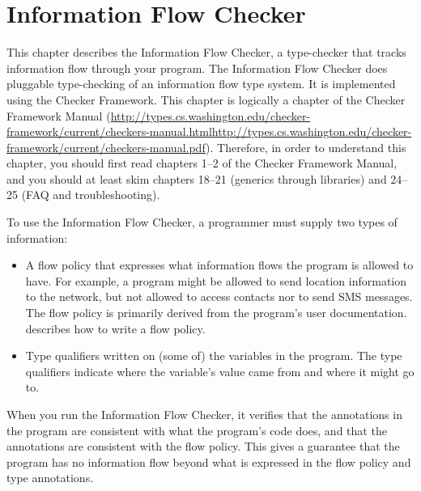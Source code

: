 \htmlhr

\newcommand{\theFlowChecker}{the Information Flow Checker\xspace}
\newcommand{\TheFlowChecker}{The Information Flow Checker\xspace}

\chapter{Information Flow Checker\label{flow-checker}}
This chapter describes the Information Flow Checker, a type-checker that 
tracks information flow through your program.
The Information Flow Checker does pluggable type-checking of an information flow type
system.  It is implemented using the Checker Framework.  This chapter is
logically a chapter of the 
Checker Framework Manual (\ifhevea\url{http://types.cs.washington.edu/checker-framework/current/checkers-manual.html}\else\url{http://types.cs.washington.edu/checker-framework/current/checkers-manual.pdf}\fi).
Therefore, in order to understand this chapter, you should first read
chapters 1--2 of the Checker Framework Manual, and you should at least skim
chapters 18--21 (generics through libraries) and 24--25 (FAQ and
troubleshooting). 



To use the Information Flow Checker, a programmer must supply two types of
information:

\begin{itemize}
\item
A flow policy that expresses what information flows the program is allowed
to have.   For example, a program might be allowed to send location
information to the network, but not allowed to access contacts nor to send
SMS messages.  The flow policy is primarily derived from the program's user
documentation.   describes how to write a flow
policy.
\item
{}
Type qualifiers written on (some of) the variables in the program.  The
type qualifiers indicate where the variable's value came from and where it
might go to.
\end{itemize}

When you run the Information Flow Checker, it verifies that the annotations in the
program are consistent with what the program's code does, and that the
annotations are consistent with the flow policy.  This gives a guarantee
that the program has no information flow beyond what is expressed in the
flow policy and type annotations.


